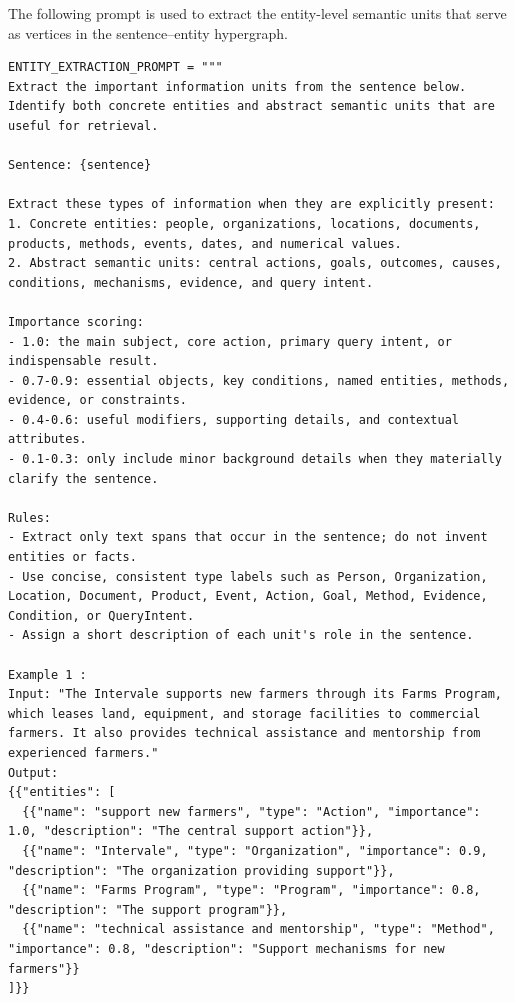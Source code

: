 \documentclass[a4paper,fleqn]{cas-dc}
\begin{document}
The following prompt is used to extract the entity-level semantic units that serve as vertices in the sentence--entity hypergraph.
\begin{lstlisting}
ENTITY_EXTRACTION_PROMPT = """
Extract the important information units from the sentence below. Identify both concrete entities and abstract semantic units that are useful for retrieval.

Sentence: {sentence}

Extract these types of information when they are explicitly present:
1. Concrete entities: people, organizations, locations, documents, products, methods, events, dates, and numerical values.
2. Abstract semantic units: central actions, goals, outcomes, causes, conditions, mechanisms, evidence, and query intent.

Importance scoring:
- 1.0: the main subject, core action, primary query intent, or indispensable result.
- 0.7-0.9: essential objects, key conditions, named entities, methods, evidence, or constraints.
- 0.4-0.6: useful modifiers, supporting details, and contextual attributes.
- 0.1-0.3: only include minor background details when they materially clarify the sentence.

Rules:
- Extract only text spans that occur in the sentence; do not invent entities or facts.
- Use concise, consistent type labels such as Person, Organization, Location, Document, Product, Event, Action, Goal, Method, Evidence, Condition, or QueryIntent.
- Assign a short description of each unit's role in the sentence.

Example 1 :
Input: "The Intervale supports new farmers through its Farms Program, which leases land, equipment, and storage facilities to commercial farmers. It also provides technical assistance and mentorship from experienced farmers."
Output:
{{"entities": [
  {{"name": "support new farmers", "type": "Action", "importance": 1.0, "description": "The central support action"}},
  {{"name": "Intervale", "type": "Organization", "importance": 0.9, "description": "The organization providing support"}},
  {{"name": "Farms Program", "type": "Program", "importance": 0.8, "description": "The support program"}},
  {{"name": "technical assistance and mentorship", "type": "Method", "importance": 0.8, "description": "Support mechanisms for new farmers"}}
]}}


\end{lstlisting}
\end{document}
